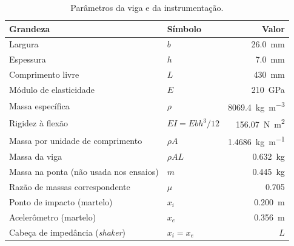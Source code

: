 \begin{table}[htbp]
    \centering
    \caption{Parâmetros da viga e da instrumentação.}
    \label{tab:parametros}
    \begin{tabular}{llr}
        \toprule
        Grandeza                                 & Símbolo                 & Valor                                      \\
        \midrule
        Largura                                  & $b$                     & \SI{26.0}{\milli\meter}                    \\
        Espessura                                & $h$                     & \SI{7.0}{\milli\meter}                     \\
        Comprimento livre                        & $L$                     & \SI{430}{\milli\meter}                     \\
        Módulo de elasticidade                   & $E$                     & \SI{210}{\giga\pascal}                     \\
        Massa específica                         & $\rho$                  & \SI{8069.4}{\kilo\gram\per\cubic\meter}    \\
        Rigidez à flexão                         & $EI = Ebh^3/12$         & \SI{156.07}{\newton\square\meter}          \\
        Massa por unidade de comprimento         & $\rho A$                & \SI{1.4686}{\kilo\gram\per\meter}          \\
        Massa da viga                            & $\rho A L$              & \SI{0.632}{\kilo\gram}                     \\
        Massa na ponta (não usada nos ensaios)   & $m$                     & \SI{0.445}{\kilo\gram}                     \\
        Razão de massas correspondente           & $\mu$                   & \num{0.705}                                \\
        Ponto de impacto (martelo)               & $x_i$                   & \SI{0.200}{\meter}                         \\
        Acelerômetro (martelo)                   & $x_e$                   & \SI{0.356}{\meter}                         \\
        Cabeça de impedância (\emph{shaker})     & $x_i = x_e$             & $L$                                        \\
        \bottomrule
    \end{tabular}
\end{table}

